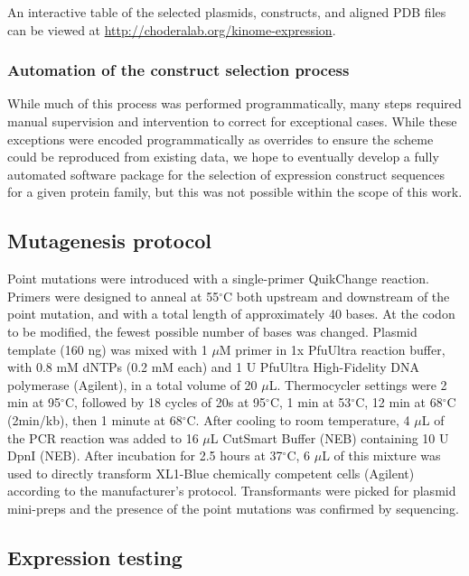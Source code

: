 \documentclass[phd,tocprelim]{cornell}
\begin{document}
An interactive table of the selected plasmids, constructs, and aligned PDB files can be viewed at \url{http://choderalab.org/kinome-expression}.

\subsubsection{Automation of the construct selection process}

While much of this process was performed programmatically, many steps required manual supervision and intervention to correct for exceptional cases.
While these exceptions were encoded programmatically as overrides to ensure the scheme could be reproduced from existing data, we hope to eventually develop a fully automated software package for the selection of expression construct sequences for a given protein family, but this was not possible within the scope of this work.

\subsection{Mutagenesis protocol}

Point mutations were introduced with a single-primer QuikChange reaction. 
Primers were designed to anneal at 55$^{\circ}$C both upstream and downstream of the point mutation, and with a total length of approximately 40 bases. 
At the codon to be modified, the fewest possible number of bases was changed. 
Plasmid template (160 ng) was mixed with 1 $\mu$M primer in 1x PfuUltra reaction buffer, with 0.8 mM dNTPs (0.2 mM each) and 1 U PfuUltra High-Fidelity DNA polymerase (Agilent), in a total volume of 20 $\mu$L. 
Thermocycler settings were 2 min at 95$^{\circ}$C, followed by 18 cycles of 20s at 95$^{\circ}$C, 1 min at 53$^{\circ}$C, 12 min at 68$^{\circ}$C (2min/kb), then 1 minute at 68$^{\circ}$C. 
After cooling to room temperature, 4 $\mu$L of the PCR reaction was added to 16 $\mu$L CutSmart Buffer (NEB) containing 10 U DpnI (NEB). 
After incubation for 2.5 hours at 37$^{\circ}$C, 6 $\mu$L of this mixture was used to directly transform XL1-Blue chemically competent cells (Agilent) according to the manufacturer’s protocol. 
Transformants were picked for plasmid mini-preps and the presence of the point mutations was confirmed by sequencing.

\subsection{Expression testing}
\end{document}
